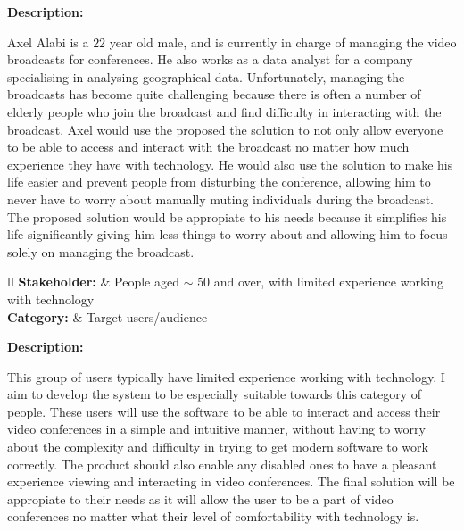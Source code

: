 \textbf{Description:} \\ \vspace{0.05cm}

Axel Alabi is a $22$ year old male, and is currently in charge 
of managing the video broadcasts for conferences.
He also works as a data analyst for a company specialising in
analysing geographical data. Unfortunately, managing the
broadcasts has become quite challenging because there is
often a number of elderly people who join the broadcast and
find difficulty in interacting with the broadcast. Axel would 
use the proposed the solution to not only allow everyone to be
able to access and interact with the broadcast no matter how 
much experience they have with technology. He would also use 
the solution to make his life easier and prevent people from 
disturbing the conference, allowing him to never have to worry
about manually muting individuals during the broadcast. The 
proposed solution would be appropiate to his needs because it 
simplifies his life significantly giving him less things to 
worry about and allowing him to focus solely on managing the 
broadcast. \vspace{0.2cm}

\noindent
\begin{tblr}{ll}
  \textbf{Stakeholder: } & {People aged $\sim$ 
  \hspace{-0.2cm} $50$ and over, with limited experience
  working with technology}\\
  \textbf{Category: } & Target users/audience\\
\end{tblr}
\vspace{0.2cm}

\textbf{Description: } \\ \vspace{0.05cm}

This group of users typically have limited experience working 
with technology. I aim to develop the system to be especially
suitable towards this category of people. These users will use
the software to be able to interact and access their video 
conferences in a simple and intuitive manner, without having 
to worry about the complexity and difficulty in trying to get
modern software to work correctly. The product should also 
enable any disabled ones to have a pleasant experience viewing
and interacting in video conferences. The final solution will
be appropiate to their needs as it will allow the user to be a 
part of video conferences no matter what their level of
comfortability with technology is. \vspace{0.2cm}

